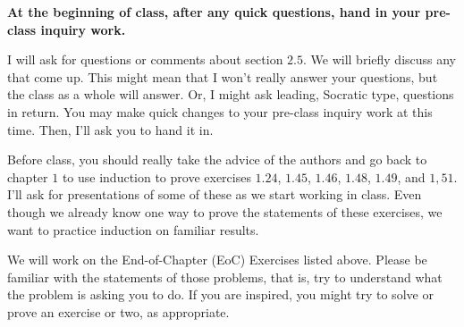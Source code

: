 \documentclass[12pt,letterpaper]{article}
\theoremstyle{definition}
\begin{document}
\textbf{At the beginning of class, after any quick questions, hand in your pre-class inquiry work.}

I will ask for questions or comments about section $2.5$. We will briefly discuss any that come up. This might mean that I won't really answer your questions, but the class as a whole will answer. Or, I might ask leading, Socratic type, questions in return. You may make quick changes to your pre-class inquiry work at this time. Then, I'll ask you to hand it in.

Before class, you should really take the advice of the authors and go back to chapter $1$ to use induction to prove exercises $1.24$, $1.45$, $1.46$, $1.48$, $1.49$, and $1,51$. I'll ask for presentations of some of these as we start working in class. Even though we already know one way to prove the statements of these exercises, we want to practice induction on familiar results. 


We will work on the End-of-Chapter (EoC) Exercises listed above. Please be familiar with the statements of those problems, that is, try to understand what the problem is asking you to do.  If you are inspired, you might try to solve or prove an exercise or two, as appropriate. 
\end{document}
